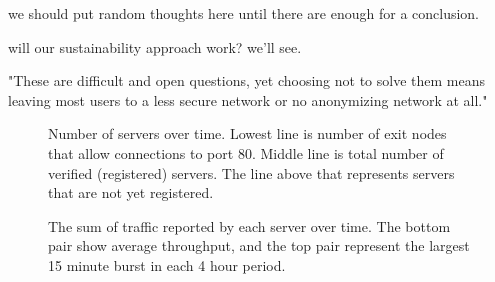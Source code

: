 \documentclass{llncs}
\begin{document}
we should put random thoughts here until there are enough for a
conclusion.

will our sustainability approach work? we'll see.

"These are difficult and open questions, yet choosing not to solve them
means leaving most users to a less secure network or no anonymizing
network at all."

 

\appendix

\begin{figure}[t]
\centering
\mbox{}
\caption{Number of servers over time. Lowest line is number of exit
nodes that allow connections to port 80. Middle line is total number of
verified (registered) servers. The line above that represents servers
that are not yet registered.}
\label{fig:graphnodes}
\end{figure}

\begin{figure}[t]
\centering
\mbox{}
\caption{The sum of traffic reported by each server over time. The bottom
pair show average throughput, and the top pair represent the largest 15
minute burst in each 4 hour period.}
\label{fig:graphtraffic}
\end{figure}
\end{document}
